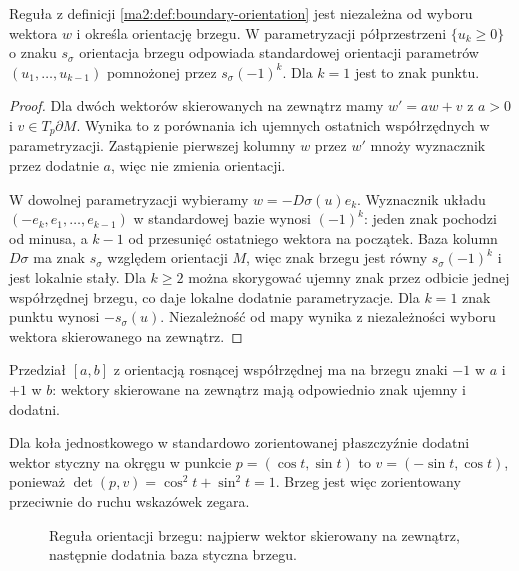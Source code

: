 \begin{stwierdzenie}
\label{ma2:prop:boundary-orientation}
Reguła z definicji \ref{ma2:def:boundary-orientation}
jest niezależna od wyboru wektora $w$ i określa
orientację brzegu.
W parametryzacji półprzestrzeni
$\{u_k\ge0\}$ o znaku $s_\sigma$ orientacja brzegu
odpowiada standardowej orientacji parametrów
$(u_1,\ldots,u_{k-1})$ pomnożonej przez
$s_\sigma(-1)^k$. Dla $k=1$ jest to znak punktu.
\end{stwierdzenie}
\begin{proof}
Dla dwóch wektorów skierowanych na zewnątrz
mamy $w'=aw+v$ z $a>0$ i $v\in T_p\partial M$.
Wynika to z porównania ich ujemnych ostatnich
współrzędnych w parametryzacji.
Zastąpienie pierwszej kolumny $w$ przez $w'$
mnoży wyznacznik przez dodatnie $a$,
więc nie zmienia orientacji.

W dowolnej parametryzacji wybieramy
$w=-D\sigma(u)e_k$. Wyznacznik układu
$(-e_k,e_1,\ldots,e_{k-1})$ w standardowej
bazie wynosi $(-1)^k$: jeden znak pochodzi
od minusa, a $k-1$ od przesunięć ostatniego
wektora na początek. Baza kolumn $D\sigma$
ma znak $s_\sigma$ względem orientacji $M$,
więc znak brzegu jest równy $s_\sigma(-1)^k$
i jest lokalnie stały.
Dla $k\ge2$ można skorygować ujemny znak
przez odbicie jednej współrzędnej brzegu,
co daje lokalne dodatnie parametryzacje.
Dla $k=1$ znak punktu wynosi $-s_\sigma(u)$.
Niezależność od mapy wynika z niezależności
wyboru wektora skierowanego na zewnątrz.
\end{proof}

\begin{przyklad}
\label{ma2:ex:boundary-orientation}
Przedział $[a,b]$ z orientacją rosnącej
współrzędnej ma na brzegu znaki $-1$ w $a$
i $+1$ w $b$: wektory skierowane na zewnątrz
mają odpowiednio znak ujemny i dodatni.

Dla koła jednostkowego w standardowo
zorientowanej płaszczyźnie dodatni wektor
styczny na okręgu w punkcie
$p=(\cos t,\sin t)$ to
$v=(-\sin t,\cos t)$, ponieważ
$\det(p,v)=\cos^2t+\sin^2t=1$.
Brzeg jest więc zorientowany przeciwnie
do ruchu wskazówek zegara.
\end{przyklad}

\begin{figure}[htbp]
\centering
{}
\caption{Reguła orientacji brzegu: najpierw wektor
skierowany na zewnątrz, następnie dodatnia baza styczna brzegu.}
\label{ma2:fig:boundary-orientation}
\end{figure}

